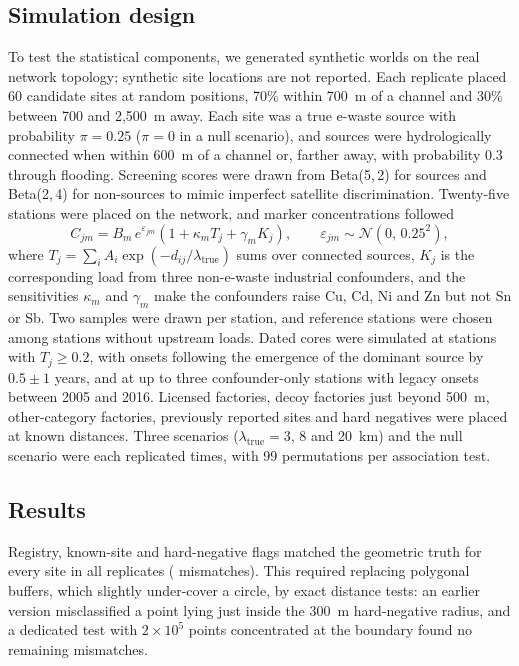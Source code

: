 \documentclass[10pt]{article}
\begin{document}
\subsection{Simulation design}
To test the statistical components, we generated synthetic worlds on the real network topology; synthetic site locations are not reported. Each replicate placed 60 candidate sites at random positions, 70\% within 700~m of a channel and 30\% between 700 and 2{,}500~m away. Each site was a true e-waste source with probability $\pi=0.25$ ($\pi=0$ in a null scenario), and sources were hydrologically connected when within 600~m of a channel or, farther away, with probability 0.3 through flooding. Screening scores were drawn from Beta(5,\,2) for sources and Beta(2,\,4) for non-sources to mimic imperfect satellite discrimination. Twenty-five stations were placed on the network, and marker concentrations followed
\begin{equation}
C_{jm}=B_m\,e^{\varepsilon_{jm}}\left(1+\kappa_m T_j+\gamma_m K_j\right),\qquad \varepsilon_{jm}\sim\mathcal{N}(0,\,0.25^2),
\label{eq:sim}
\end{equation}
where $T_j=\sum_i A_i\exp(-d_{ij}/\lambda_{\mathrm{true}})$ sums over connected sources, $K_j$ is the corresponding load from three non-e-waste industrial confounders, and the sensitivities $\kappa_m$ and $\gamma_m$ make the confounders raise Cu, Cd, Ni and Zn but not Sn or Sb. Two samples were drawn per station, and reference stations were chosen among stations without upstream loads. Dated cores were simulated at stations with $T_j\geq0.2$, with onsets following the emergence of the dominant source by $0.5\pm1$ years, and at up to three confounder-only stations with legacy onsets between 2005 and 2016. Licensed factories, decoy factories just beyond 500~m, other-category factories, previously reported sites and hard negatives were placed at known distances. Three scenarios ($\lambda_{\mathrm{true}}=3$, 8 and 20~km) and the null scenario were each replicated \simReps{} times, with 99 permutations per association test.

\subsection{Results}
Registry, known-site and hard-negative flags matched the geometric truth for every site in all \simRepsTotal{} replicates (\flagMismatches{} mismatches). This required replacing polygonal buffers, which slightly under-cover a circle, by exact distance tests: an earlier version misclassified a point lying just inside the 300~m hard-negative radius, and a dedicated test with $2\times10^5$ points concentrated at the boundary found no remaining mismatches.
\end{document}
